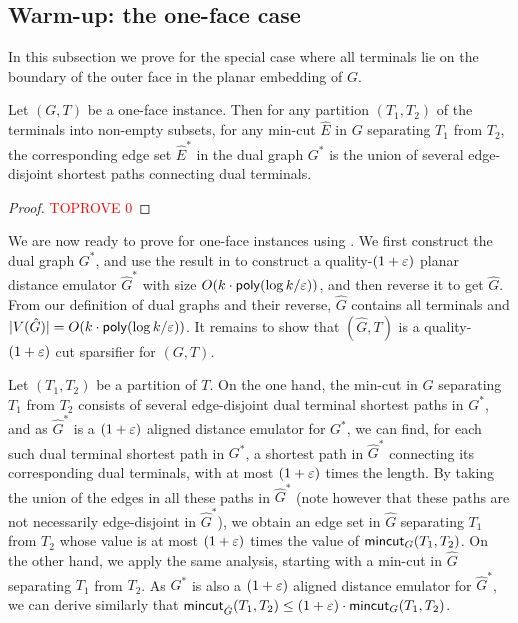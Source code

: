 \subsection{Warm-up: the one-face case}
\label{sec: 1-face}

In this subsection we prove  for the special case where all terminals lie on the boundary of the outer face in the planar embedding of $G$.



\begin{lemma}
	\label{lem: mincut structure}
Let $(G,T)$ be a one-face instance. Then for any partition $(T_1,T_2)$ of the terminals into non-empty subsets, for any min-cut $\hat E$ in $G$ separating $T_1$ from $T_2$, the corresponding edge set $\hat E^*$ in the dual graph $G^*$ is the union of several edge-disjoint shortest paths connecting dual terminals.
\end{lemma}

\begin{proof}\textcolor{red}{TOPROVE 0}\end{proof}


We are now ready to prove  for one-face instances using .
We first construct the dual graph $G^*$, and use the result in \cite{chang2022near} to construct a quality-$(1+{\varepsilon})$ planar distance emulator $\hat G^*$ with size $O(k\cdot \mathsf{poly}(\log k/{\varepsilon}))$, and then reverse it to get $\hat G$. 
From our definition of dual graphs and their reverse, $\hat G$ contains all terminals and $|V(\hat G)|=O(k\cdot \mathsf{poly}(\log k/{\varepsilon}))$. It remains to show that $(\hat G,T)$ is a quality-$(1+{\varepsilon})$ cut sparsifier for $(G,T)$. 

Let $(T_1,T_2)$ be a partition of $T$.
On the one hand, the min-cut in $G$ separating $T_1$ from $T_2$ consists of several edge-disjoint dual terminal shortest paths in $G^*$, and as $\hat G^*$ is a $(1+{\varepsilon})$ aligned distance emulator for $G^*$, we can find, for each such dual terminal shortest path in $G^*$, a shortest path in $\hat G^*$ connecting its corresponding dual terminals, with at most $(1+{\varepsilon})$ times the length. By taking the union of the edges in all these paths in $\hat G^*$ (note however that these paths are not necessarily edge-disjoint in $\hat G^*$), we obtain an edge set in $\hat G$ separating $T_1$ from $T_2$ whose value is at most $(1+{\varepsilon})$ times the value of $\mathsf{mincut}_G(T_1,T_2)$. 
On the other hand, we apply the same analysis, starting with a min-cut in $\hat G$ separating $T_1$ from $T_2$. As $G^*$ is also a $(1+{\varepsilon})$ aligned distance emulator for $\hat G^*$, we can derive similarly that $\mathsf{mincut}_{\hat G}(T_1,T_2)\le (1+{\varepsilon})\cdot \mathsf{mincut}_G(T_1,T_2)$.



